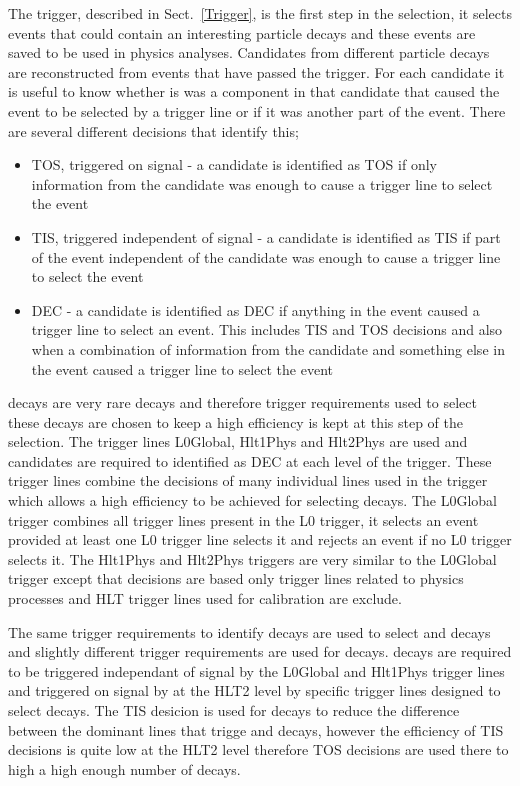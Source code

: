 The trigger, described in Sect.~\ref{Trigger}, is the first step in the selection, it selects events that could contain an interesting particle decays and these events are saved to be used in physics analyses. Candidates from different particle decays are reconstructed from events that have passed the trigger. For each candidate it is useful to know whether is was a component in that candidate that caused the event to be selected by a trigger line or if it was another part of the event. There are several different decisions that identify this;
\begin{itemize}
\item TOS, triggered on signal - a candidate is identified as TOS if only information from the candidate was enough to cause a trigger line to select the event
\item TIS, triggered independent of signal - a candidate is identified as TIS if part of the event independent of the candidate was enough to cause a trigger line to select the event
\item DEC - a candidate is identified as DEC if anything in the event caused a trigger line to select an event. This includes TIS and TOS decisions and also when a combination of information from the candidate and something else in the event caused a trigger line to select the event
\end{itemize}

\bsmumu decays are very rare decays and therefore trigger requirements used to select these decays are chosen to keep a high efficiency is kept at this step of the selection. The trigger lines L0Global, Hlt1Phys and Hlt2Phys are used and candidates are required to identified as DEC at each level of the trigger. These trigger lines combine the decisions of many individual lines used in the trigger which allows a high efficiency to be achieved for selecting \bsmumu decays. The L0Global trigger combines all trigger lines present in the L0 trigger, it selects an event provided at least one L0 trigger line selects it and rejects an event if no L0 trigger selects it. The Hlt1Phys and Hlt2Phys triggers are very similar to the L0Global trigger except that decisions are based only trigger lines related to physics processes and HLT trigger lines used for calibration are exclude.

The same trigger requirements to identify \bmumu decays are used to select \bujpsik and \bsjpisphi decays and slightly different trigger requirements are used for \bhh decays. \bhh decays are required to be triggered independant of signal by the L0Global and Hlt1Phys trigger lines and triggered on signal by at the HLT2 level by specific trigger lines designed to select \bhh decays. The TIS desicion is used for \bhh decays to reduce the difference between the dominant lines that trigge \bhh and \bmumu decays, however the efficiency of TIS decisions is quite low at the HLT2 level therefore TOS decisions are used there to high a high enough number of decays.

